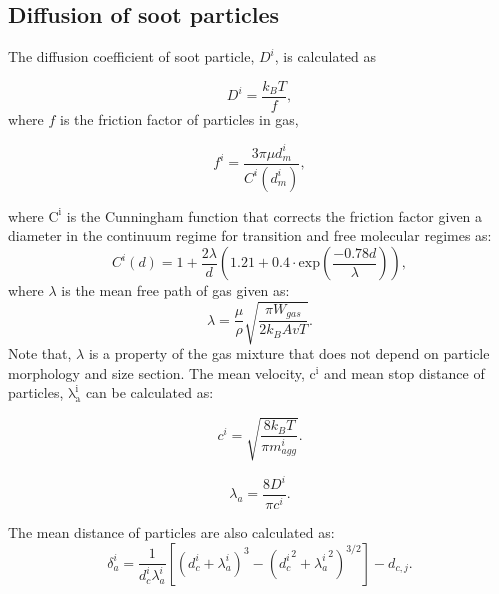 \subsection{Diffusion of soot particles}

The diffusion coefficient of soot particle, $D^i$, is calculated as

\begin{equation}
	D^i = \frac{k_B T}{f}
	\label{eqn:diff},
\end{equation}
\noindent where $f$ is the friction factor of particles in gas,

\begin{equation}
	f^i = \frac{3\pi\mu d^i_m}{C^i(d^i_m)}
	\label{eqn:fraction},
\end{equation}

\noindent where $\mathrm{C^i}$ is the Cunningham function that corrects the friction factor given a diameter in the continuum regime for transition and free molecular regimes as: 
\begin{equation}
	C^i(d) = 1+\frac{2\lambda}{d}
	\left(
	1.21+0.4\cdot\mathrm{exp}(\frac{-0.78d}{\lambda})
	\right)
	\label{eqn:cun},
\end{equation}
\noindent where $\lambda$ is the mean free path of gas given as:
\begin{equation}
	\lambda = \frac{\mu}{\rho}\sqrt{\frac{\pi W_{gas}}{2k_B Av T}}
	\label{eqn:lambda}.
\end{equation}
Note that, $\lambda$ is a property of the gas mixture that does not depend on particle morphology and size section. The mean velocity, $\mathrm{c^i}$ and mean stop distance of particles, $\mathrm{\lambda^i_a}$ can be calculated as:

\begin{equation}
	c^i = \sqrt{\frac{8k_B T}{\pi m^i_{agg}}}
	\label{eqn:meanvel}.
\end{equation}

\begin{equation}
	\lambda_a = \frac{8D^i}{\pi c^i}
	\label{eqn:stopdist}.
\end{equation}

The mean distance of particles are also calculated as:
\begin{equation}
	\delta^i_a=\frac{1}{d^i_c\lambda^i_a}
	\left[
		\left(
			d^i_c+\lambda^i_a
		\right)^3
		-\left(
			{d^i_c}^2+{\lambda^i_a}^2
		\right)^{3 / 2}
	\right]
	-d_{c, j}    
	\label{eqn:meandist}.
\end{equation}


